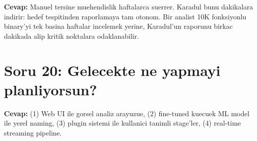 \documentclass[12pt,a4paper,oneside]{book}
\theoremstyle{definition}
\begin{document}
\textbf{Cevap:} Manuel tersine muehendislik haftalarca suerrer. Karadul bunu dakikalara indirir: hedef tespitinden raporlamaya tam otonom. Bir analist 10K fonksiyonlu binary'yi tek basina haftalar incelemek yerine, Karadul'un raporunu birka\-c dakikada alip kritik noktala\-ra odaklanabilir.

\section{Soru 20: Gelecekte ne yapmayi planliyorsun?}

\textbf{Cevap:} (1) Web UI ile gorsel analiz arayuzue, (2) fine-tuned kuecuek ML model ile yerel naming, (3) plugin sistemi ile kullanici tanimli stage'ler, (4) real-time streaming pipeline.


\printindex
\end{document}
